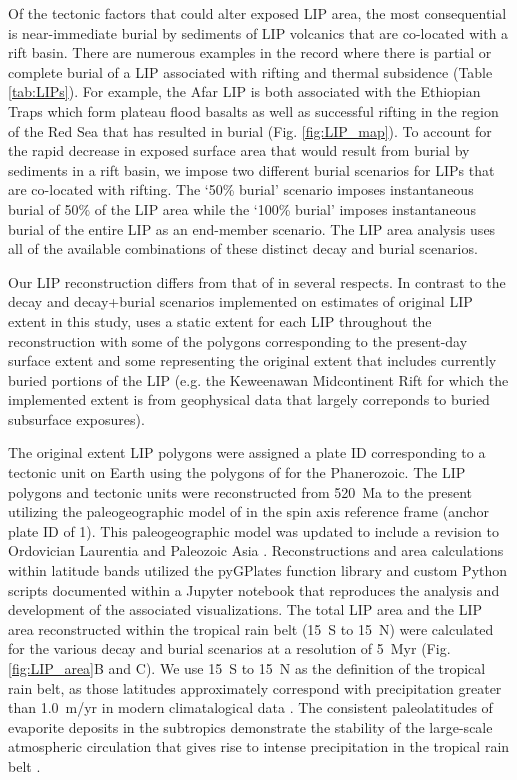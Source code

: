 \documentclass[11pt,letterpaper]{article}
\begin{document}
Of the tectonic factors that could alter exposed LIP area, the most consequential is near-immediate burial by sediments of LIP volcanics that are co-located with a rift basin. There are numerous examples in the record where there is partial or complete burial of a LIP associated with rifting and thermal subsidence (Table \ref{tab:LIPs}). For example, the Afar LIP is both associated with the Ethiopian Traps which form plateau flood basalts as well as successful rifting in the region of the Red Sea that has resulted in burial (Fig. \ref{fig:LIP_map}). To account for the rapid decrease in exposed surface area that would result from burial by sediments in a rift basin, we impose two different burial scenarios for LIPs that are co-located with rifting. The `50\% burial' scenario imposes instantaneous burial of 50$\%$ of the LIP area while the `100\% burial' imposes instantaneous burial of the entire LIP as an end-member scenario. The LIP area analysis uses all of the available combinations of these distinct decay and burial scenarios.

Our LIP reconstruction differs from that of \citet{Johansson2018a} in several respects. In contrast to the decay and decay+burial scenarios implemented on estimates of original LIP extent in this study, \citet{Johansson2018a} uses a static extent for each LIP throughout the reconstruction with some of the polygons corresponding to the present-day surface extent and some representing the original extent that includes currently buried portions of the LIP (e.g. the Keweenawan Midcontinent Rift for which the implemented extent is from geophysical data that largely correponds to buried subsurface exposures).

The original extent LIP polygons were assigned a plate ID corresponding to a tectonic unit on Earth using the polygons of \citet{Torsvik2016a} for the Phanerozoic. The LIP polygons and tectonic units were reconstructed from 520~Ma to the present utilizing the paleogeographic model of \citet{Torsvik2016a} in the spin axis reference frame (anchor plate ID of 1). This paleogeographic model was updated to include a revision to Ordovician Laurentia \citep{Swanson-Hysell2017a} and Paleozoic Asia \citep{Domeier2018a}. Reconstructions and area calculations within latitude bands utilized the pyGPlates function library and custom Python scripts documented within a Jupyter notebook that reproduces the analysis and development of the associated visualizations. The total LIP area and the LIP area reconstructed within the tropical rain belt (15\textdegree~S to 15\textdegree~N) were calculated for the various decay and burial scenarios at a resolution of 5~Myr (Fig. \ref{fig:LIP_area}B and C). We use 15\textdegree~S to 15\textdegree~N as the definition of the tropical rain belt, as those latitudes approximately correspond with precipitation greater than 1.0~m/yr in modern climatalogical data \citep{Kalnay1996a}. The consistent paleolatitudes of evaporite deposits in the subtropics demonstrate the stability of the large-scale atmospheric circulation that gives rise to intense precipitation in the tropical rain belt \citep{Evans2006a}.
\end{document}
